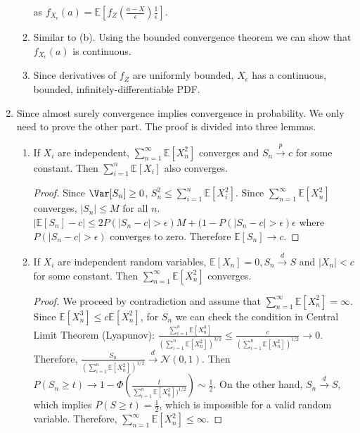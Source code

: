 \documentclass{article}
\begin{document}
\begin{enumerate}
\begin{enumerate}
    as
    $f_{X_{\epsilon}}(a) = \mathbb{E}[f_{Z}(\frac{a-X}{\epsilon})\frac{1}{\epsilon}]$.
    \item Similar to (b). Using the bounded convergence theorem
    we can show that $f_{X_{\epsilon}}(a) $
    is continuous.
    \item Since derivatives of $f_{Z}$ are uniformly
    bounded, $X_{\epsilon}$ has a continuous,
    bounded, infinitely-differentiable PDF.
    \end{enumerate} 
    \item Since almost surely convergence implies convergence
    in probability. We only need to prove the other part.
    The proof is divided into three lemmas.
    \begin{enumerate}
        \item If $X_i$ are independent, $\sum_{n=1}^{\infty}
        \mathbb{E}[X_n^2]$ converges and $S_n \xrightarrow{p} c$ for some constant. Then $  \sum_{i=1}^{n} \mathbb{E}[X_i]$ also converges.
        \begin{proof}
        Since $\Var[S_n] \geq 0 $, $S_n^2 \leq \sum_{i=1}^n \mathbb{E}[X_i^2]$. Since $\sum_{n=1}^{\infty}
        \mathbb{E}[X_n^2]$ converges, $|S_n| \leq M$
        for all $n$.
        $|\mathbb{E}[S_n] - c| \leq 2P(|S_n - c|>\epsilon) M +
    (1-P(|S_n - c|>\epsilon)\epsilon$ where $P(|S_n - c|>\epsilon)$ converges to zero. Therefore
    $\mathbb{E}[S_n] \to c$.  
        \end{proof}
        \item If $X_i$ are independent random variables, $\mathbb{E}[X_n]=0, S_n \xrightarrow{d} S$
        and $|X_n| < c$ for some constant. Then $\sum_{n=1}^{\infty} \mathbb{E}[X_n^2]$ converges.
        \begin{proof}
        We proceed by contradiction and assume that
        $\sum_{n=1}^{\infty} \mathbb{E}[X_n^2] = \infty$.
        Since $\mathbb{E}[X_n^3] \leq c \mathbb{E}[X_n^2]$,
        for $S_n$ we can check the condition in Central Limit Theorem (Lyapunov): $\frac{\sum_{i=1}^n \mathbb{E}[X_n^3]}{(\sum_{i=1}^n \mathbb{E}[X_n^2])^{3/2}} \leq \frac{c}{(\sum_{i=1}^n \mathbb{E}[X_n^2])^{1/2}} \to 0$.
        Therefore, $\frac{S_n}{(\sum_{i=1}^n \mathbb{E}[X_n^2])^{1/2}} \xrightarrow{d} \mathcal{N}(0,1)$.
        Then $P(S_n \geq t) \to 1 - \Phi(\frac{t}{\sum_{i=1}^n \mathbb{E}[X_n^2])^{1/2}}) \sim \frac{1}{2} $.
        On the other hand, $S_n \xrightarrow{d} S$, which
        implies
        $P(S\geq t) = \frac{1}{2}$, which is impossible
        for a valid random variable. Therefore, 
        $\sum_{n=1}^{\infty} \mathbb{E}[X_n^2] \leq \infty$.

\end{proof}
\end{enumerate}
\end{enumerate}
\end{document}
